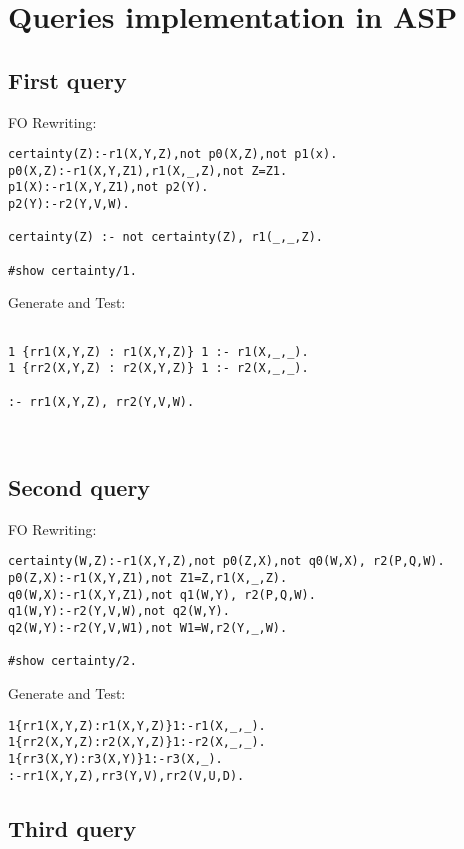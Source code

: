 
\section{Queries implementation in ASP}

\subsection{First query}

FO Rewriting:
\begin{lstlisting}
certainty(Z):-r1(X,Y,Z),not p0(X,Z),not p1(x).
p0(X,Z):-r1(X,Y,Z1),r1(X,_,Z),not Z=Z1.
p1(X):-r1(X,Y,Z1),not p2(Y).
p2(Y):-r2(Y,V,W).

certainty(Z) :- not certainty(Z), r1(_,_,Z).

#show certainty/1.

\end{lstlisting}

Generate and Test:
\begin{lstlisting}

1 {rr1(X,Y,Z) : r1(X,Y,Z)} 1 :- r1(X,_,_).
1 {rr2(X,Y,Z) : r2(X,Y,Z)} 1 :- r2(X,_,_).

:- rr1(X,Y,Z), rr2(Y,V,W).



\end{lstlisting}


\subsection{Second query}


FO Rewriting:
\begin{lstlisting}
certainty(W,Z):-r1(X,Y,Z),not p0(Z,X),not q0(W,X), r2(P,Q,W).
p0(Z,X):-r1(X,Y,Z1),not Z1=Z,r1(X,_,Z).
q0(W,X):-r1(X,Y,Z1),not q1(W,Y), r2(P,Q,W).
q1(W,Y):-r2(Y,V,W),not q2(W,Y).
q2(W,Y):-r2(Y,V,W1),not W1=W,r2(Y,_,W).

#show certainty/2.
\end{lstlisting}

Generate and Test:
\begin{lstlisting}
1{rr1(X,Y,Z):r1(X,Y,Z)}1:-r1(X,_,_).
1{rr2(X,Y,Z):r2(X,Y,Z)}1:-r2(X,_,_).
1{rr3(X,Y):r3(X,Y)}1:-r3(X,_).
:-rr1(X,Y,Z),rr3(Y,V),rr2(V,U,D).

\end{lstlisting}


\subsection{Third query}

